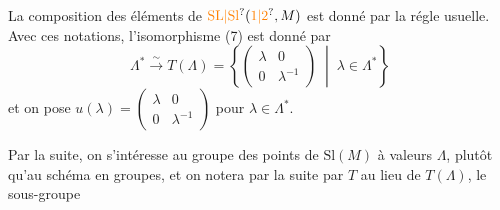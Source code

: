 La composition des éléments de $\mathrm{\unsure{SL|Sl}}(\unsure{1|2},M)$ est donné par la régle usuelle. Avec ces notations, l'isomorphisme (7) est donné par
\[
 \Lambda^*\xrightarrow{\sim}T(\Lambda)=\left\{\begin{pmatrix}\lambda&0\\0&\lambda^{-1}\end{pmatrix}\;\middle|\;\lambda\in\Lambda^*\right\}\tag*{(10)}
\]
et on pose $u(\lambda)=\begin{pmatrix}\lambda&0\\0&\lambda^{-1}\end{pmatrix}$ pour $\lambda\in\Lambda^*$.

Par la suite, on s'intéresse au groupe des points  de $\mathrm{Sl}(M)$ à valeurs  $\Lambda$, plutôt qu'au schéma en groupes, et on notera par la suite par $T$ au lieu de $T(\Lambda)$, le sous-groupe
